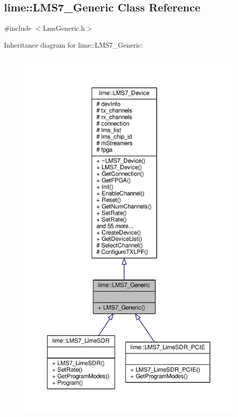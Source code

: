 \subsection{lime\+:\+:L\+M\+S7\+\_\+\+Generic Class Reference}
\label{classlime_1_1LMS7__Generic}


{\ttfamily \#include $<$Lms\+Generic.\+h$>$}



Inheritance diagram for lime\+:\+:L\+M\+S7\+\_\+\+Generic\+:
\nopagebreak
\begin{figure}[H]
\begin{center}
\leavevmode
\includegraphics[height=550pt]{d8/dd2/classlime_1_1LMS7__Generic__inherit__graph}
\end{center}
\end{figure}


